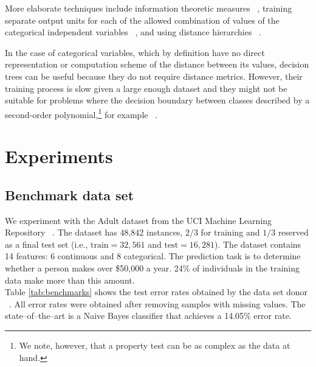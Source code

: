 \documentclass[10pt,twocolumn,letterpaper]{article}
\begin{document}
More elaborate techniques include information theoretic measures
~\cite{wang2008categorical}, training separate output units for
each of the allowed combination of values of the categorical independent
variables ~\cite{brouwer2002feed}, and using distance
hierarchies ~\cite{hsu2006generalizing}.

In the case of categorical variables, which by definition have no direct
representation or computation scheme of the distance between its values,
decision trees can be useful because they do not require distance metrics.
However, their training process is slow given a large enough dataset and they
might not be suitable for problems where the decision boundary between classes
described by a second-order polynomial,\footnote{We note, however, that a
property test can be as complex as the data at hand.} for
example ~\cite{fayyad1996data}. \\

\section{Experiments} \label{section:experiments}

\subsection{Benchmark data set}

We experiment with the Adult dataset from the UCI Machine Learning Repository ~\cite{Lichman2013}. The dataset has 48,842 instances, $2/3$ for training and $1/3$ reserved as a final test set (i.e., $\mathrm{train}=32,561$ and $\mathrm{test}=16,281$). The dataset contains 14 features: 6 continuous and 8 categorical. The prediction task is to determine whether a person makes over \$50,000 a year. 24\% of individuals in the training data make more than this amount. \\

Table \ref{tab:benchmarks} shows the test error rates obtained by the data set donor ~\cite{kohavi1996}. All error rates were obtained after removing samples with missing values. The state--of--the--art is a Naive Bayes classifier that achieves a  14.05\% error rate. \\
\end{document}
